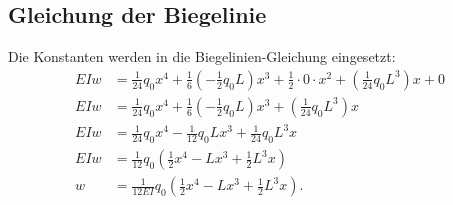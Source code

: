 \subsection{Gleichung der Biegelinie}
Die Konstanten werden in die Biegelinien-Gleichung eingesetzt:
\begin{align}
	EIw&=
	\frac{1}{24}q_0x^4+\frac{1}{6}\left(-\frac{1}{2}q_0L\right)x^3+\frac{1}{2}\cdot0\cdot x^2+\left(\frac{1}{24}q_0L^3\right)x+0
  \\
	EIw&=
	\frac{1}{24}q_0x^4+\frac{1}{6}\left(-\frac{1}{2}q_0L\right)x^3+\left(\frac{1}{24}q_0L^3\right)x
	\\
	EIw&=
	\frac{1}{24}q_0x^4-\frac{1}{12}q_0Lx^3+\frac{1}{24}q_0L^3x
	\\
	EIw&=
	\frac{1}{12}q_0\left(\frac{1}{2}x^4-Lx^3+\frac{1}{2}L^3x\right)
	\\
	w&=
	\frac{1}{12EI}q_0\left(\frac{1}{2}x^4-Lx^3+\frac{1}{2}L^3x\right).
\end{align}

